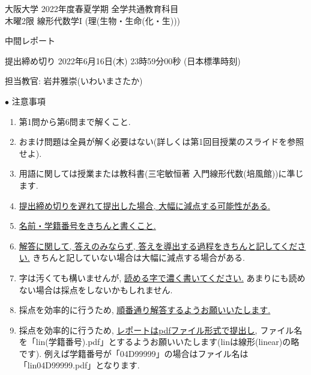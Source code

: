 \documentclass[dvipdfmx,a4paper,11pt]{article}
\theoremstyle{definition}
\begin{document}
\begin{center}
{ \large 大阪大学 2022年度春夏学期 全学共通教育科目 \\ 木曜2限 線形代数学I (理(生物・生命(化・生)))} \\
\vspace{5pt}

{\LARGE 中間レポート } \\
\vspace{5pt}

{ \Large 提出締め切り 2022年6月16日(木) 23時59分00秒 (日本標準時刻)}
\end{center}

\begin{flushright}
 担当教官: 岩井雅崇(いわいまさたか) 
\end{flushright}

{\Large $\bullet$ 注意事項}
\begin{enumerate}
\item 第1問から第6問まで解くこと. 
\item おまけ問題は全員が解く必要はない(詳しくは第1回目授業のスライドを参照せよ).
\item 用語に関しては授業または教科書(三宅敏恒著 入門線形代数(培風館))に準じます.
\item \underline{提出締め切りを遅れて提出した場合, 大幅に減点する可能性がある.}
\item \underline{名前・学籍番号をきちんと書くこと.}
\item \underline{解答に関して, 答えのみならず, 答えを導出する過程をきちんと記してください.} きちんと記していない場合は大幅に減点する場合がある.
\item 字は汚くても構いませんが, \underline{読める字で濃く書いてください.} あまりにも読めない場合は採点をしないかもしれません.%
\item 採点を効率的に行うため, \underline{順番通り解答するようお願いいたします.}
\item 採点を効率的に行うため,  \underline{レポートはpdfファイル形式で提出し,} ファイル名を「lin(学籍番号).pdf」とするようお願いいたします(linは線形(linear)の略です).
例えば学籍番号が「04D99999」の場合はファイル名は「lin04D99999.pdf」となります.
\end{enumerate}
\end{document}
